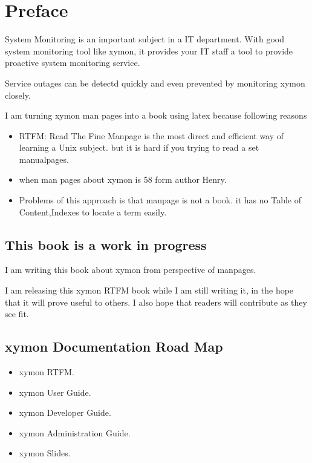 \chapter{Preface}
\label{chap:preface}

System Monitoring is an important subject in a IT department.
With good system monitoring tool like xymon, it provides your IT
staff a tool to provide proactive system monitoring service.

Service outages can be detectd quickly and even prevented by monitoring
xymon closely.

I am turning xymon man pages into a book using latex because following reasons

\begin{itemize}
\item RTFM: Read The Fine Manpage is the most direct and efficient way of
learning a Unix subject. but it is hard if you trying to read a set manualpages.
\item  when man pages about xymon is 58 form author Henry.
\item Problems of this approach is that manpage is not a book. it has no
Table of Content,Indexes to locate a term easily.

\end{itemize}

\section{This book is a work in progress}

I am writing this  book about xymon from perspective of manpages.  

I am releasing this xymon RTFM book while I am still writing it, in the hope that
it will prove useful to others.  I also hope that readers will
contribute as they see fit.

\section{xymon Documentation Road Map}


\begin{itemize}
\item xymon RTFM.
\item xymon User Guide.
\item xymon Developer Guide.
\item xymon Administration Guide.
\item xymon Slides.

\end{itemize}

